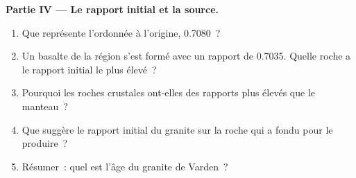 \begin{problem}
\medskip
\noindent\textbf{Partie IV --- Le rapport initial et la source.}
\begin{enumerate}[resume]
  \item Que représente l'ordonnée à l'origine, 0.7080~?
  \item Un basalte de la région s'est formé avec un rapport de 0.7035.
        Quelle roche a le rapport initial le plus élevé~?
  \item Pourquoi les roches crustales ont-elles des rapports plus élevés
        que le manteau~?
  \item Que suggère le rapport initial du granite sur la roche qui a fondu
        pour le produire~?
  \item Résumer~: quel est l'âge du granite de Varden~?
\end{enumerate}
\end{problem}
